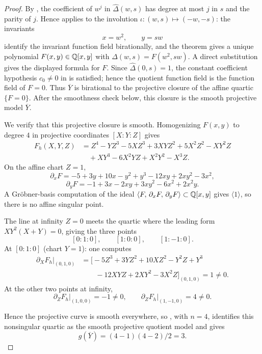 \begin{proof}

By , the coefficient of \(w^j\) in
\(\widehat\Delta(w,s)\) has degree at most \(j\) in \(s\) and the
parity of \(j\). Hence
 applies to the involution
\(\iota:(w,s)\mapsto(-w,-s)\): the invariants
\[
  x=w^2,\qquad y=sw
\]
identify the invariant function field birationally, and the theorem
gives a unique polynomial \(F(x,y)\in\mathbb{Q}[x,y]\) with
\(\widehat\Delta(w,s)=F(w^2,sw)\).
A direct substitution gives the displayed formula for \(F\). Since
\(\widehat\Delta(0,s)=1\), the constant coefficient hypothesis
\(c_0\ne0\) in  is satisfied; hence
the quotient function field is the function field of \(F=0\). Thus
\(\overline{Y}\) is birational to the projective closure of the affine
quartic \(\{F=0\}\).
After the smoothness check below, this closure is the smooth projective
model \(\overline{Y}\).

We verify that this projective closure is smooth. Homogenizing
\(F(x,y)\) to degree \(4\) in projective coordinates \([X:Y:Z]\) gives
\[
\begin{aligned}
  F_h(X,Y,Z)
  &= Z^4 - YZ^3 - 5XZ^3 + 3XYZ^2 + 5X^2Z^2 - XY^2Z \\
  &\quad + XY^3 - 6X^2YZ + X^2Y^2 - X^3Z .
\end{aligned}
\]
On the affine chart \(Z=1\),
\[
  \partial_x F
  =-5+3y+10x-y^2+y^3-12xy+2xy^2-3x^2,
\]
\[
  \partial_y F
  =-1+3x-2xy+3xy^2-6x^2+2x^2y.
\]
A Gr\"obner-basis computation of the ideal
\(\langle F,\,\partial_x F,\,\partial_y F\rangle\subset\mathbb{Q}[x,y]\)
gives \(\langle 1\rangle\), so there is no affine singular point.

The line at infinity \(Z=0\) meets the quartic where the leading form
\(XY^2(X+Y)=0\), giving the three points
\[
  [0:1:0],\qquad [1:0:0],\qquad [1:-1:0].
\]
At \([0:1:0]\) (chart \(Y=1\)): one computes
\[
\begin{aligned}
  \partial_X F_h\big|_{(0,1,0)}
  &=
  \bigl[-5Z^3+3YZ^2+10XZ^2-Y^2Z+Y^3 \\
  &\qquad -12XYZ+2XY^2-3X^2Z\bigr]_{(0,1,0)}
  = 1\neq 0 .
\end{aligned}
\]
At the other two points at infinity,
\[
  \partial_Z F_h\big|_{(1,0,0)}=-1\neq 0,
  \qquad
  \partial_Z F_h\big|_{(1,-1,0)}=4\neq 0 .
\]

Hence the projective curve is smooth everywhere, so
, with \(n=4\), identifies this
nonsingular quartic as the smooth projective quotient model and gives
\[
  g(\overline{Y})=(4-1)(4-2)/2=3.
\]

\end{proof}

